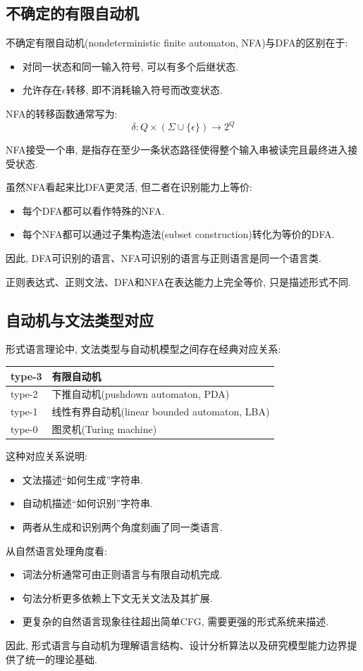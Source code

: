 \subsection{不确定的有限自动机}


不确定有限自动机(nondeterministic finite automaton, NFA)与DFA的区别在于:

\begin{itemize}
\item 对同一状态和同一输入符号, 可以有多个后继状态.
\item 允许存在$\epsilon$转移, 即不消耗输入符号而改变状态.
\end{itemize}

NFA的转移函数通常写为:
\[
\delta: Q \times (\Sigma \cup \{\epsilon\}) \to 2^Q
\]

NFA接受一个串, 是指存在至少一条状态路径使得整个输入串被读完且最终进入接受状态.

虽然NFA看起来比DFA更灵活, 但二者在识别能力上等价:

\begin{itemize}
\item 每个DFA都可以看作特殊的NFA.
\item 每个NFA都可以通过子集构造法(subset construction)转化为等价的DFA.
\end{itemize}

因此, DFA可识别的语言、NFA可识别的语言与正则语言是同一个语言类.

正则表达式、正则文法、DFA和NFA在表达能力上完全等价, 只是描述形式不同.

\subsection{自动机与文法类型对应}


形式语言理论中, 文法类型与自动机模型之间存在经典对应关系:
\begin{table}[H]
\centering
\begingroup
\setlength{\tabcolsep}{2pt}
\small
\begin{tabular}{|p{}|p{}|}
\hline
type-3 & 有限自动机 \\ \hline
type-2 & 下推自动机(pushdown automaton, PDA) \\ \hline
type-1 & 线性有界自动机(linear bounded automaton, LBA) \\ \hline
type-0 & 图灵机(Turing machine) \\ \hline
\end{tabular}
\endgroup
\end{table}
这种对应关系说明:

\begin{itemize}
\item 文法描述“如何生成”字符串.
\item 自动机描述“如何识别”字符串.
\item 两者从生成和识别两个角度刻画了同一类语言.
\end{itemize}

从自然语言处理角度看:

\begin{itemize}
\item 词法分析通常可由正则语言与有限自动机完成.
\item 句法分析更多依赖上下文无关文法及其扩展.
\item 更复杂的自然语言现象往往超出简单CFG, 需要更强的形式系统来描述.
\end{itemize}

因此, 形式语言与自动机为理解语言结构、设计分析算法以及研究模型能力边界提供了统一的理论基础.
